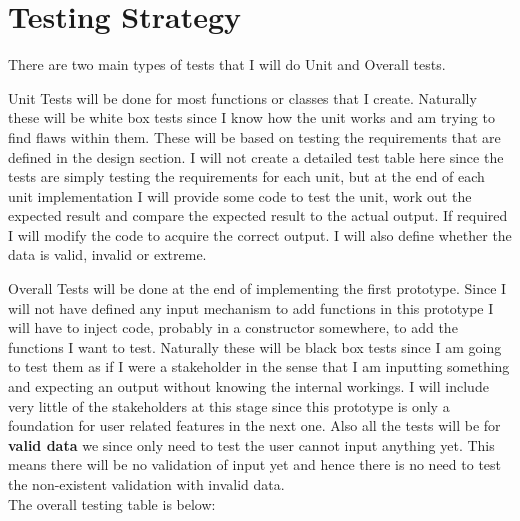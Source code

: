 \documentclass[../../../../main.tex]{subfiles}
\begin{document}
\section{Testing Strategy}
There are two main types of tests that I will do Unit and Overall tests.


Unit Tests will be done for most functions or classes that I create. Naturally these will be white box tests since I  know how the unit works and am trying to find flaws within them. These will be based on testing the requirements that are defined in the design section. I will not create a detailed test table here since the tests are simply testing the requirements for each unit, but at the end of each unit implementation I will provide some code to test the unit, work out the expected result and compare the expected result to the actual output. If required I will modify the code to acquire the correct output. I will also define whether the data is valid, invalid or extreme.


Overall Tests will be done at the end of implementing the first prototype. Since I will not have defined any input mechanism to add functions in this prototype I will have to inject code, probably in a constructor somewhere, to add the functions I want to test. Naturally these will be black box tests since I am going to test them as if I were a stakeholder in the sense that I am inputting something and expecting an output without knowing the internal workings. I will include very little of the stakeholders at this stage since this prototype is only a foundation for user related features in the next one. Also all the tests will be for \textbf{valid data} we since only need to test the user cannot input anything yet. This means there will be no validation of input yet and hence there is no need to test the non-existent validation with invalid data.\\
The overall testing table is below:
\end{document}
